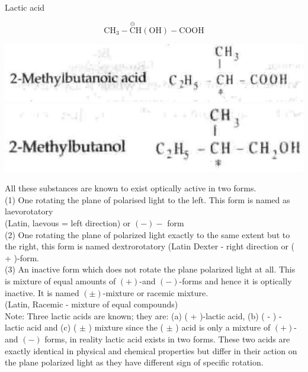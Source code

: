 \documentclass[10pt]{article}
\begin{document}
Lactic acid

$$
\mathrm{CH}_{3}-\stackrel{\ominus}{\mathrm{C}} \mathrm{H}(\mathrm{OH})-\mathrm{COOH}
$$

\includegraphics[max width=\textwidth, center]{2025_01_28_8470952b98110cec3aabg-049}\\
\includegraphics[max width=\textwidth, center]{2025_01_28_8470952b98110cec3aabg-049(1)}

All these substances are known to exist optically active in two forms.\\
(1) One rotating the plane of polarised light to the left. This form is named as laevorotatory\\
(Latin, laevous = left direction) or $(-)-$ form\\
(2) One rotating the plane of polarized light exactly to the same extent but to the right, this form is named dextrorotatory (Latin Dexter - right direction or ( + )-form.\\
(3) An inactive form which does not rotate the plane polarized light at all. This is mixture of equal amounts of $(+)$-and $(-)$-forms and hence it is optically inactive. It is named $( \pm)$-mixture or racemic mixture.\\
(Latin, Racemic - mixture of equal compounds)\\
Note: Three lactic acids are known; they are: (a) ( + )-lactic acid, (b) ( - ) - lactic acid and (c) ( $\pm$ ) mixture since the ( $\pm$ ) acid is only a mixture of $(+)$-and $(-)$ forms, in reality lactic acid exists in two forms. These two acids are exactly identical in physical and chemical properties but differ in their action on the plane polarized light as they have different sign of specific rotation.
\end{document}
